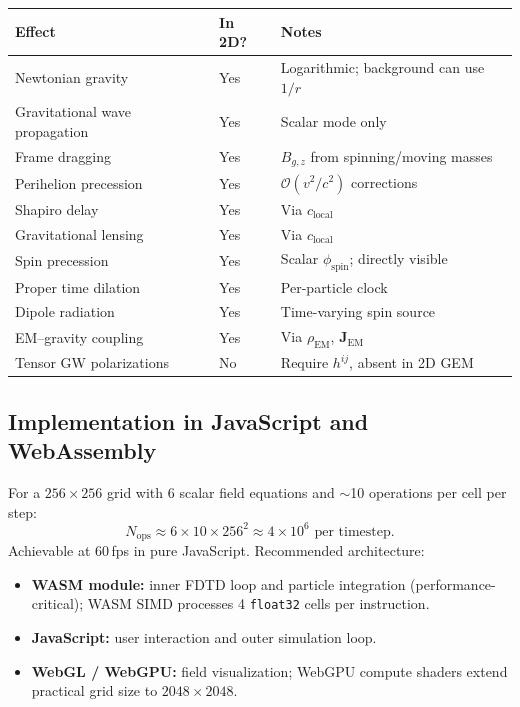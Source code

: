 \documentclass[11pt,a4paper]{article}
\newcommand{\vv}[1]{\mathbf{#1}}
\newcommand{\order}[1]{\mathcal{O}(#1)}
\begin{document}
\begin{center}
\begin{tabular}{@{}L{4.5cm}L{2cm}L{6.5cm}@{}}
\toprule
\textbf{Effect} & \textbf{In 2D?} & \textbf{Notes} \\
\midrule
Newtonian gravity          & Yes & Logarithmic; background can use $1/r$ \\
Gravitational wave propagation & Yes & Scalar mode only \\
Frame dragging             & Yes & $B_{g,z}$ from spinning/moving masses \\
Perihelion precession      & Yes & $\order{v^2/c^2}$ corrections \\
Shapiro delay              & Yes & Via $c_{\mathrm{local}}$ \\
Gravitational lensing      & Yes & Via $c_{\mathrm{local}}$ \\
Spin precession            & Yes & Scalar $\phi_{\mathrm{spin}}$; directly visible \\
Proper time dilation       & Yes & Per-particle clock \\
Dipole radiation           & Yes & Time-varying spin source \\
EM--gravity coupling       & Yes & Via $\rho_{\mathrm{EM}}$, $\vv{J}_{\mathrm{EM}}$ \\
Tensor GW polarizations    & No  & Require $h^{ij}$, absent in 2D GEM \\
\bottomrule
\end{tabular}
\end{center}

\subsection{Implementation in JavaScript and WebAssembly}

For a $256\times 256$ grid with 6 scalar field equations and $\sim$10 operations per cell per step:
\begin{equation}
  N_{\mathrm{ops}} \approx 6 \times 10 \times 256^2 \approx 4\times 10^6 \text{ per timestep.}
\end{equation}
Achievable at 60\,fps in pure JavaScript.  Recommended architecture:
\begin{itemize}
  \item \textbf{WASM module:} inner FDTD loop and particle integration (performance-critical); WASM SIMD processes 4 \texttt{float32} cells per instruction.
  \item \textbf{JavaScript:} user interaction and outer simulation loop.
  \item \textbf{WebGL / WebGPU:} field visualization; WebGPU compute shaders extend practical grid size to $2048\times 2048$.
\end{itemize}
\end{document}
